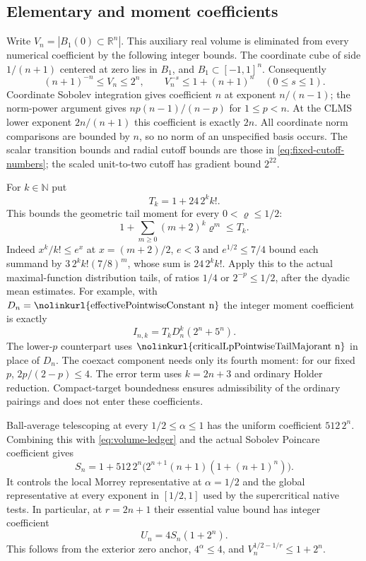 \documentclass[11pt,a4paper]{article}
\numberwithin{equation}{section}
\theoremstyle{definition}
\theoremstyle{remark}
\newcommand{\R}{\mathbb R}
\newcommand{\lean}[1]{\nolinkurl{#1}}
\begin{document}
\subsection{Elementary and moment coefficients}
Write $V_n=|B_1(0)\subset\R^n|$. This auxiliary real volume is eliminated
from every numerical coefficient by the following integer bounds.
The coordinate cube of side
$1/(n+1)$ centered at zero lies in $B_1$, and $B_1\subset[-1,1]^n$.
Consequently
\begin{equation}\label{eq:volume-ledger}
 (n+1)^{-n}\leq V_n\leq2^n,\qquad
 V_n^{-s}\leq1+(n+1)^n\quad(0\leq s\leq1).
\end{equation}
Coordinate Sobolev integration gives coefficient $n$ at exponent
$n/(n-1)$; the norm-power argument gives
$n p(n-1)/(n-p)$ for $1\leq p<n$. At the CLMS lower exponent
$2n/(n+1)$ this coefficient is exactly $2n$.
All coordinate norm comparisons are bounded by $n$, so no norm of an
unspecified basis occurs. The scalar transition bounds and radial
cutoff bounds are those in \eqref{eq:fixed-cutoff-numbers}; the
scaled unit-to-two cutoff has gradient bound $2^{22}$.

For $k\in\mathbb N$ put
\[
 T_k=1+24\,2^k k!.
\]
This bounds the geometric tail moment for every $0<\varrho\leq1/2$:
\[
 1+\sum_{m\geq0}(m+2)^k\varrho^m\leq T_k.
\]
Indeed $x^k/k!\leq e^x$ at $x=(m+2)/2$, $e<3$ and
$e^{1/2}\leq7/4$ bound each summand by
$3\,2^k k!(7/8)^m$, whose sum is $24\,2^k k!$.
Apply this to the actual maximal-function distribution tails, of ratios
$1/4$ or $2^{-p}\leq1/2$, after the dyadic mean estimates. For example,
with $D_n=\text{\lean{effectivePointwiseConstant n}}$ the integer moment
coefficient is exactly
\begin{equation}\label{eq:moment-ledger}
 I_{n,k}=T_kD_n^k(2^n+5^n).
\end{equation}
The lower-$p$ counterpart uses
$\text{\lean{criticalLpPointwiseTailMajorant n}}$ in place of $D_n$.
The coexact component needs only its fourth moment: for our fixed $p$,
$2p/(2-p)\leq4$. The error term uses $k=2n+3$ and ordinary Holder
reduction. Compact-target boundedness ensures admissibility of the
ordinary pairings and does not enter these coefficients.

Ball-average telescoping at every $1/2\leq\alpha\leq1$ has the
uniform coefficient $512\,2^n$. Combining this with
\eqref{eq:volume-ledger} and the actual Sobolev Poincare coefficient gives
\begin{equation}\label{eq:S-ledger}
 S_n=1+512\,2^n\bigl(2^{n+1}(n+1)(1+(n+1)^n)\bigr).
\end{equation}
It controls the local Morrey representative at $\alpha=1/2$ and the
global representative at every exponent in $[1/2,1]$ used by the
supercritical native tests. In particular, at $r=2n+1$ their essential
value bound has integer coefficient
\[
 U_n=4S_n(1+2^n).
\]
This follows from the exterior zero anchor, $4^\alpha\leq4$, and
$V_n^{1/2-1/r}\leq1+2^n$.
\end{document}
